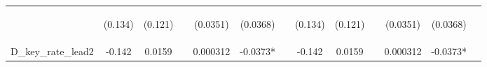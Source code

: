 \documentclass[]{article}
\begin{document}
\begin{center}
\begin{tabular}{lcccccccccccc}
\vspace{4pt} & \begin{footnotesize}(0.134)\end{footnotesize} & \begin{footnotesize}(0.121)\end{footnotesize} & \begin{footnotesize}\end{footnotesize} & \begin{footnotesize}(0.0351)\end{footnotesize} & \begin{footnotesize}(0.0368)\end{footnotesize} & \begin{footnotesize}\end{footnotesize} & \begin{footnotesize}(0.134)\end{footnotesize} & \begin{footnotesize}(0.121)\end{footnotesize} & \begin{footnotesize}\end{footnotesize} & \begin{footnotesize}(0.0351)\end{footnotesize} & \begin{footnotesize}(0.0368)\end{footnotesize} & \begin{footnotesize}\end{footnotesize} \\
D\_key\_rate\_lead2 & -0.142 & 0.0159 &  & 0.000312 & -0.0373* &  & -0.142 & 0.0159 &  & 0.000312 & -0.0373* &  \\

\end{tabular}
\end{center}
\end{document}
